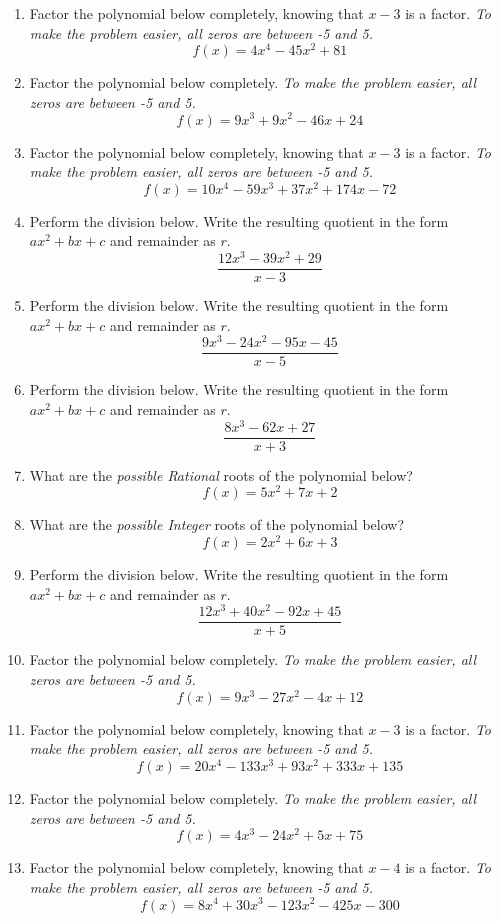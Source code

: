 \documentclass[14pt]{extbook}
\begin{document}
\begin{enumerate}
\item{
Factor the polynomial below completely, knowing that $x -3$ is a factor. \textit{To make the problem easier, all zeros are between -5 and 5.}\[ f(x) = 4x^{4} -45 x^{2} + 81 \]} \newpage
\item{
Factor the polynomial below completely. \textit{To make the problem easier, all zeros are between -5 and 5.}\[ f(x) = 9x^{3} +9 x^{2} -46 x + 24 \]} \newpage
\item{
Factor the polynomial below completely, knowing that $x -3$ is a factor. \textit{To make the problem easier, all zeros are between -5 and 5.}\[ f(x) = 10x^{4} -59 x^{3} +37 x^{2} +174 x -72 \]} \newpage
\item{
Perform the division below. Write the resulting quotient in the form $ax^2+bx+c$ and remainder as $r$.\[ \frac{12x^{3} -39 x^{2} + 29}{x -3} \]} \newpage
\item{
Perform the division below. Write the resulting quotient in the form $ax^2+bx+c$ and remainder as $r$.\[ \frac{9x^{3} -24 x^{2} -95 x -45}{x -5} \]} \newpage
\item{
Perform the division below. Write the resulting quotient in the form $ax^2+bx+c$ and remainder as $r$.\[ \frac{8x^{3} -62 x + 27}{x + 3} \]} \newpage
\item{
What are the \textit{possible Rational} roots of the polynomial below?\[ f(x) = 5x^{2} +7 x + 2 \]} \newpage
\item{
What are the \textit{possible Integer} roots of the polynomial below?\[ f(x) = 2x^{2} +6 x + 3 \]} \newpage
\item{
Perform the division below. Write the resulting quotient in the form $ax^2+bx+c$ and remainder as $r$.\[ \frac{12x^{3} +40 x^{2} -92 x + 45}{x + 5} \]} \newpage
\item{
Factor the polynomial below completely. \textit{To make the problem easier, all zeros are between -5 and 5.}\[ f(x) = 9x^{3} -27 x^{2} -4 x + 12 \]} \newpage
\item{
Factor the polynomial below completely, knowing that $x -3$ is a factor. \textit{To make the problem easier, all zeros are between -5 and 5.}\[ f(x) = 20x^{4} -133 x^{3} +93 x^{2} +333 x + 135 \]} \newpage
\item{
Factor the polynomial below completely. \textit{To make the problem easier, all zeros are between -5 and 5.}\[ f(x) = 4x^{3} -24 x^{2} +5 x + 75 \]} \newpage
\item{
Factor the polynomial below completely, knowing that $x -4$ is a factor. \textit{To make the problem easier, all zeros are between -5 and 5.}\[ f(x) = 8x^{4} +30 x^{3} -123 x^{2} -425 x -300 \]} \newpage

\end{enumerate}
\end{document}
